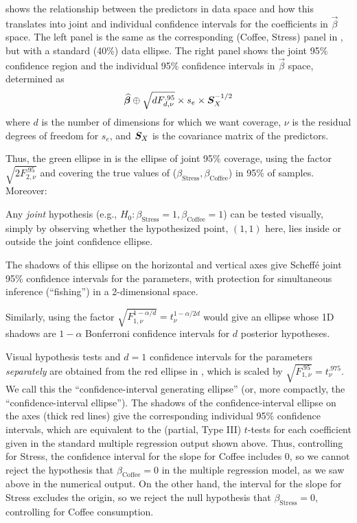  shows the relationship between the
predictors in data space and how this translates into joint and
individual confidence intervals for the coefficients in
$\vec{\beta}$ space.  The left panel is the same as the corresponding
(Coffee, Stress) panel in , but with
a standard (40\%) data ellipse. The right panel shows the joint 95\% confidence
region and the individual 95\% confidence intervals in $\vec{\beta}$ space, determined as
\begin{equation*}
 \widehat{\bm{\beta}} \oplus \sqrt{d F^{.95}_{d, \nu}} \times s_e \times \bm{S}_X^{-1/2}
\end{equation*}
where $d$ is the number of dimensions for which we want coverage,
$\nu$ is the residual degrees of freedom for $s_e$, and $\bm{S}_X$
is the covariance matrix of the predictors.

Thus, the green ellipse in  is the
ellipse of joint 95\% coverage, using the factor $\sqrt{2 F^{.95}_{2, \nu}}$
and covering the true values of ($\beta_{\mathrm{Stress}}, \beta_{\mathrm{Coffee}}$)
in 95\% of samples.  Moreover:
\begin{itemize*}
  \item Any \emph{joint} hypothesis (e.g., $H_0:\beta_{\mathrm{Stress}}=1, \beta_{\mathrm{Coffee}}=1$)
can be tested visually, simply by observing whether the
hypothesized point, $(1, 1)$ here, lies inside or outside the joint confidence ellipse.
  \item The shadows of this ellipse on the horizontal and vertical axes
give Scheff\'e joint 95\%  confidence intervals for the parameters, with protection for 
simultaneous inference (``fishing'')
in a 2-dimensional space.
  \item Similarly, using the factor
$\sqrt{F^{1-\alpha/d}_{1, \nu}} = t^{1-\alpha/2d}_\nu$ would give an
ellipse whose 1D shadows are $1-\alpha$ Bonferroni confidence intervals
for $d$ posterior hypotheses.
\end{itemize*}

Visual hypothesis tests and $d=1$ confidence intervals for the parameters \emph{separately}
are obtained from the red ellipse in ,
which is scaled by $\sqrt{F^{.95}_{1, \nu}} = t^{.975}_\nu$. We call this the ``confidence-interval generating ellipse'' (or, more compactly, the ``confidence-interval ellipse'').
The shadows of the confidence-interval ellipse on the axes (thick red lines) give the
corresponding individual 95\% confidence intervals, which are
equivalent to the (partial, Type III) $t$-tests for each coefficient given in the
standard multiple regression output shown above.
Thus, controlling for Stress, the confidence interval for the slope for Coffee includes 0,
so we cannot reject the hypothesis that $\beta_{\mathrm{Coffee}}=0$
in the multiple regression model, as we saw above in the numerical output.
On the other hand, the interval for the slope for Stress excludes the origin,
so we reject the null hypothesis that $\beta_{\mathrm{Stress}}=0$,
controlling for Coffee consumption.

